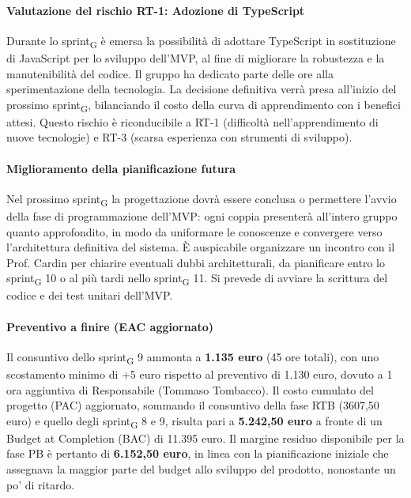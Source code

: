 \documentclass[11pt,a4paper]{article}
\newcommand{\gls}[1]{#1\textsubscript{G}}
\begin{document}
\paragraph{Valutazione del rischio RT-1: Adozione di TypeScript}
Durante lo \gls{sprint} è emersa la possibilità di adottare TypeScript in sostituzione di JavaScript per lo sviluppo dell'MVP, al fine di migliorare la robustezza e la manutenibilità del codice. Il gruppo ha dedicato parte delle ore alla sperimentazione della tecnologia. La decisione definitiva verrà presa all'inizio del prossimo \gls{sprint}, bilanciando il costo della curva di apprendimento con i benefici attesi. Questo rischio è riconducibile a RT-1 (difficoltà nell'apprendimento di nuove tecnologie) e RT-3 (scarsa esperienza con strumenti di sviluppo).
 
\paragraph{Miglioramento della pianificazione futura}
Nel prossimo \gls{sprint} la progettazione dovrà essere conclusa o permettere l'avvio della fase di programmazione dell'MVP: ogni coppia presenterà all'intero gruppo quanto approfondito, in modo da uniformare le conoscenze e convergere verso l'architettura definitiva del sistema. È auspicabile organizzare un incontro con il Prof. Cardin per chiarire eventuali dubbi architetturali, da pianificare entro lo \gls{sprint} 10 o al più tardi nello \gls{sprint} 11. Si prevede di avviare la scrittura del codice e dei test unitari dell'MVP.
 
\paragraph{Preventivo a finire (EAC aggiornato)}
Il consuntivo dello \gls{sprint} 9 ammonta a \textbf{1.135 euro} (45 ore totali), con uno scostamento minimo di +5 euro rispetto al preventivo di 1.130 euro, dovuto a 1 ora aggiuntiva di Responsabile (Tommaso Tombacco).
Il costo cumulato del progetto (PAC) aggiornato, sommando il consuntivo della fase RTB (3607,50 euro) e quello degli \gls{sprint} 8 e 9, risulta pari a \textbf{5.242,50 euro} a fronte di un Budget at Completion (BAC) di 11.395 euro. Il margine residuo disponibile per la fase PB è pertanto di \textbf{6.152,50 euro}, in linea con la pianificazione iniziale che assegnava la maggior parte del budget allo sviluppo del prodotto, nonostante un po' di ritardo.

\newpage
\end{document}
